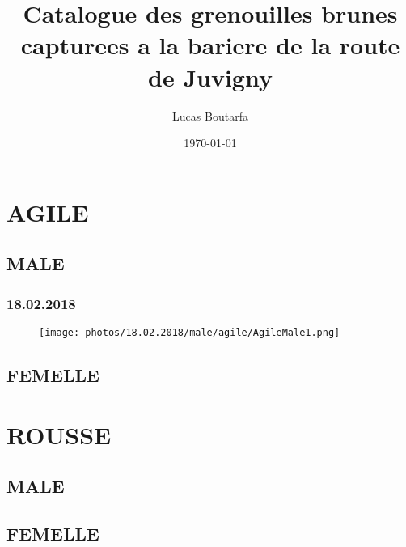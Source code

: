 \documentclass{article}%
\title{Catalogue des grenouilles brunes\newline%
        capturees a la bariere de la route de Juvigny}%
\author{Lucas Boutarfa}%
\date{\today}%
\begin{document}
%
\normalsize%
\maketitle%


\section{AGILE}%
\subsection{MALE}%

\subsubsection{18.02.2018}%


\begin{figure}%
\centering%
\texttt{[image: photos/18.02.2018/male/agile/AgileMale1.png]}%
\end{figure}

\subsection{FEMELLE}%

\section{ROUSSE}%
\subsection{MALE}%

%
\subsection{FEMELLE}%
\end{document}
